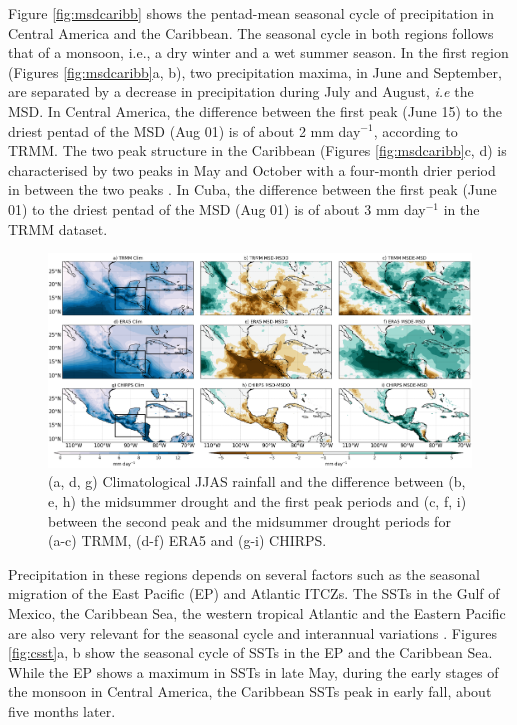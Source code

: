 Figure \ref{fig:msdcaribb} shows the pentad-mean seasonal cycle of precipitation in Central America and the Caribbean. The seasonal cycle in both regions follows that of a monsoon, i.e., a dry winter and a wet summer season. In the first region (Figures \ref{fig:msdcaribb}a, b), two precipitation maxima, in June and September, are separated by a decrease in precipitation during July and August, \textit{i.e} the MSD. In Central America, the difference between the first peak (June 15) to the driest pentad of the MSD (Aug 01) is of about 2 mm day$^{-1}$, according to TRMM. 
 The two peak structure in the Caribbean (Figures \ref{fig:msdcaribb}c, d) is characterised by two peaks in May and October with a four-month drier period in between the two peaks  \citep[e.g.][]{giannini2000,gamble2008,angeles2010origins}. In Cuba, the difference between the first peak (June 01) to the driest pentad of the MSD (Aug 01) is of about 3 mm day$^{-1}$ in the TRMM dataset. 
 
  \begin{figure}[t!]
\includegraphics[width=\linewidth]{figures/fig2obs_prdiff_2.png}
\caption{ (a, d, g) Climatological JJAS rainfall and the difference between  (b, e, h)  the midsummer drought and the first peak periods and (c, f, i)  between the second peak and the midsummer drought periods for (a-c) TRMM, (d-f) ERA5 and (g-i) CHIRPS.}
\label{fig:eof2}
\end{figure}

 


Precipitation in these regions depends on several factors such as the seasonal migration of the East Pacific (EP) and Atlantic ITCZs. The SSTs in the Gulf of Mexico, the Caribbean Sea, the western tropical Atlantic and the Eastern Pacific are also very relevant for the seasonal cycle and interannual variations \citep{magana1999,amador2008,straffon2019}. Figures \ref{fig:csst}a, b show the seasonal cycle of SSTs in the EP and the Caribbean Sea. While the EP shows a maximum in SSTs in late May, during the early stages of the monsoon in Central America, the Caribbean SSTs peak in early fall, about five months later. 


